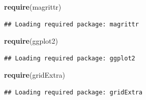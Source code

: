 \documentclass[]{article}
\newenvironment{Shaded}{\begin{snugshade}}{\end{snugshade}}
\newcommand{\KeywordTok}[1]{\textcolor[rgb]{0.13,0.29,0.53}{\textbf{{#1}}}}
\newcommand{\NormalTok}[1]{{#1}}
\begin{document}
\begin{Shaded}
\begin{Highlighting}[]
\KeywordTok{require}\NormalTok{(magrittr)}
\end{Highlighting}
\end{Shaded}

\begin{verbatim}
## Loading required package: magrittr
\end{verbatim}

\begin{Shaded}
\begin{Highlighting}[]
\KeywordTok{require}\NormalTok{(ggplot2)}
\end{Highlighting}
\end{Shaded}

\begin{verbatim}
## Loading required package: ggplot2
\end{verbatim}

\begin{Shaded}
\begin{Highlighting}[]
\KeywordTok{require}\NormalTok{(gridExtra)}
\end{Highlighting}
\end{Shaded}

\begin{verbatim}
## Loading required package: gridExtra
\end{verbatim}
\end{document}
